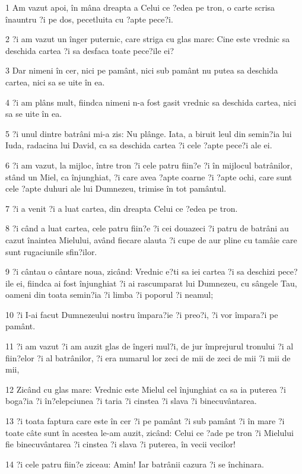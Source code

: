 \par 1 Am vazut apoi, în mâna dreapta a Celui ce ?edea pe tron, o carte scrisa înauntru ?i pe dos, pecetluita cu ?apte pece?i.
\par 2 ?i am vazut un înger puternic, care striga cu glas mare: Cine este vrednic sa deschida cartea ?i sa desfaca toate pece?ile ei?
\par 3 Dar nimeni în cer, nici pe pamânt, nici sub pamânt nu putea sa deschida cartea, nici sa se uite în ea.
\par 4 ?i am plâns mult, fiindca nimeni n-a fost gasit vrednic sa deschida cartea, nici sa se uite în ea.
\par 5 ?i unul dintre batrâni mi-a zis: Nu plânge. Iata, a biruit leul din semin?ia lui Iuda, radacina lui David, ca sa deschida cartea ?i cele ?apte pece?i ale ei.
\par 6 ?i am vazut, la mijloc, între tron ?i cele patru fiin?e ?i în mijlocul batrânilor, stând un Miel, ca înjunghiat, ?i care avea ?apte coarne ?i ?apte ochi, care sunt cele ?apte duhuri ale lui Dumnezeu, trimise în tot pamântul.
\par 7 ?i a venit ?i a luat cartea, din dreapta Celui ce ?edea pe tron.
\par 8 ?i când a luat cartea, cele patru fiin?e ?i cei douazeci ?i patru de batrâni au cazut înaintea Mielului, având fiecare alauta ?i cupe de aur pline cu tamâie care sunt rugaciunile sfin?ilor.
\par 9 ?i cântau o cântare noua, zicând: Vrednic e?ti sa iei cartea ?i sa deschizi pece?ile ei, fiindca ai fost înjunghiat ?i ai rascumparat lui Dumnezeu, cu sângele Tau, oameni din toata semin?ia ?i limba ?i poporul ?i neamul;
\par 10 ?i I-ai facut Dumnezeului nostru împara?ie ?i preo?i, ?i vor împara?i pe pamânt.
\par 11 ?i am vazut ?i am auzit glas de îngeri mul?i, de jur împrejurul tronului ?i al fiin?elor ?i al batrânilor, ?i era numarul lor zeci de mii de zeci de mii ?i mii de mii,
\par 12 Zicând cu glas mare: Vrednic este Mielul cel înjunghiat ca sa ia puterea ?i boga?ia ?i în?elepciunea ?i taria ?i cinstea ?i slava ?i binecuvântarea.
\par 13 ?i toata faptura care este în cer ?i pe pamânt ?i sub pamânt ?i în mare ?i toate câte sunt în acestea le-am auzit, zicând: Celui ce ?ade pe tron ?i Mielului fie binecuvântarea ?i cinstea ?i slava ?i puterea, în vecii vecilor!
\par 14 ?i cele patru fiin?e ziceau: Amin! Iar batrânii cazura ?i se închinara.

